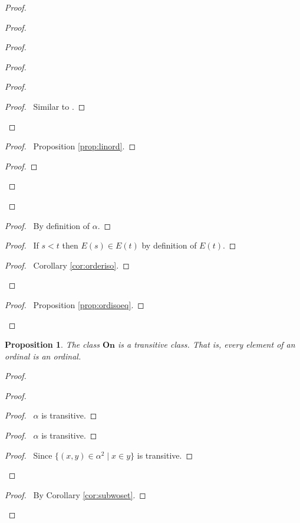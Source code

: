 \documentclass{book}
\let\qed\relax
\newtheorem{prop}[ax]{Proposition}
\theoremstyle{definition}
\begin{document}
\begin{proof}
\begin{proof}
\begin{proof}
\begin{proof}
\begin{proof}
\begin{proof}
					\pf\ Similar to .
				\end{proof}
			\end{proof}
			\begin{proof}
				\pf\ Proposition \ref{prop:linord}.
			\end{proof}
			\begin{proof}
			\end{proof}
		\end{proof}
	\end{proof}
	\begin{proof}
		\pf\ By definition of $\alpha$.
	\end{proof}
	\begin{proof}
		\pf\ If $s < t$ then $E(s) \in E(t)$ by definition of $E(t)$.
	\end{proof}
	\qedstep
	\begin{proof}
		\pf\ Corollary \ref{cor:orderiso}.
	\end{proof}
\end{proof}
\begin{proof}
	\pf\ Proposition \ref{prop:ordisoeq}.
\end{proof}
\qed
\end{proof}

\begin{prop}
\label{prop:elordinal}
The class $\mathbf{On}$ is a transitive class. That is, every element of an ordinal is an ordinal.
\end{prop}

\begin{proof}
\pf
{}
\begin{proof}
	\begin{proof}
		\pf\ $\alpha$ is transitive.
	\end{proof}
	\begin{proof}
		\pf\ $\alpha$ is transitive.
	\end{proof}
	\begin{proof}
		\pf\ Since $\{(x,y) \in \alpha^2 \mid x \in y\}$ is transitive.
	\end{proof}
\end{proof}
\begin{proof}
	\pf\ By Corollary \ref{cor:subwoset}.
\end{proof}
\qed
\end{proof}
\end{document}
